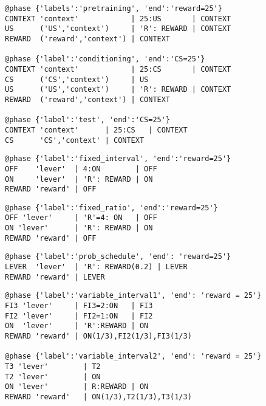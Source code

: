 \documentclass[11pt]{article}
\begin{document}
\belowcaptionskip=-10pt
\begin{lstlisting}[caption={Three \texttt{@phase} sections for classical conditioning}, label=lst:phase_example1]
@phase {'labels':'pretraining', 'end':'reward=25'}
CONTEXT	'context'            | 25:US       | CONTEXT
US      ('US','context')     | 'R': REWARD | CONTEXT
REWARD  ('reward','context') | CONTEXT

@phase {'label':'conditioning', 'end':'CS=25'}
CONTEXT 'context'            | 25:CS       | CONTEXT
CS      ('CS','context')     | US
US      ('US','context')     | 'R': REWARD | CONTEXT
REWARD  ('reward','context') | CONTEXT

@phase {'label':'test', 'end':'CS=25'}
CONTEXT 'context'      | 25:CS   | CONTEXT
CS      'CS','context' | CONTEXT
\end{lstlisting}

\begin{lstlisting}[caption={A \texttt{@phase} section for fixed interval}, label=lst:phase_example2]
@phase {'label':'fixed_interval', 'end':'reward=25'}
OFF    'lever'  | 4:ON        | OFF
ON     'lever'  | 'R': REWARD | ON
REWARD 'reward' | OFF
\end{lstlisting}

\begin{lstlisting}[caption={A \texttt{@phase} section for fixed ratio}, label=lst:phase_example3]
@phase {'label':'fixed_ratio', 'end':'reward=25'}
OFF 'lever'     | 'R'=4: ON   | OFF
ON 'lever'      | 'R': REWARD | ON 
REWARD 'reward' | OFF
\end{lstlisting}

\begin{lstlisting}[caption={A \texttt{@phase} section using a probability schedule}, label=lst:phase_example4]
@phase {'label':'prob_schedule', 'end': 'reward=25'}
LEVER  'lever'  | 'R': REWARD(0.2) | LEVER  
REWARD 'reward' | LEVER  
\end{lstlisting}

\begin{lstlisting}[caption={Two equivalent \texttt{@phase} sections for variable interval}, label=lst:phase_example5]
@phase {'label':'variable_interval1', 'end': 'reward = 25'}
FI3	'lever'     | FI3=2:ON   | FI3
FI2	'lever'     | FI2=1:ON   | FI2
ON	'lever'     | 'R':REWARD | ON
REWARD 'reward' | ON(1/3),FI2(1/3),FI3(1/3)  

@phase {'label':'variable_interval2', 'end': 'reward = 25'}
T3 'lever'        | T2
T2 'lever'        | ON
ON 'lever'        | R:REWARD | ON
REWARD 'reward'   | ON(1/3),T2(1/3),T3(1/3)  
\end{lstlisting}
\end{document}
